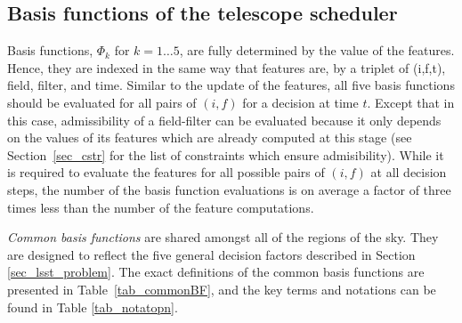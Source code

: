 \documentclass[12pt]{aastex62}
\theoremstyle{definition}
\begin{document}
\subsection{Basis functions of the telescope scheduler}\label{sec_lsst_bfs}
Basis functions, $\Phi_k$ for $k = 1 \dots 5$, are fully determined by the value of the features. Hence, they are indexed in the same way that features are, by a triplet of (i,f,t), field, filter, and time. Similar to the update of the features, all five basis functions should be evaluated for all pairs of $(i,f)$ for a decision at time $t$. Except that in this case, admissibility of a field-filter can be evaluated because it only depends on the values of its features which are already computed at this stage (see Section~\ref{sec_cstr} for the list of constraints which ensure admisibility). While it is required to evaluate the features for all possible pairs of $(i,f)$ at all decision steps, the number of the basis function evaluations is on average a factor of three times less than the number of the feature computations.

\textit{Common basis functions} are shared amongst all of the regions of the sky. They are designed to reflect the five general decision factors described in Section \ref{sec_lsst_problem}. The exact definitions of the common basis functions are presented in Table~\ref{tab_commonBF}, and the key terms and notations can be found in Table \ref{tab_notatopn}. 
\end{document}
